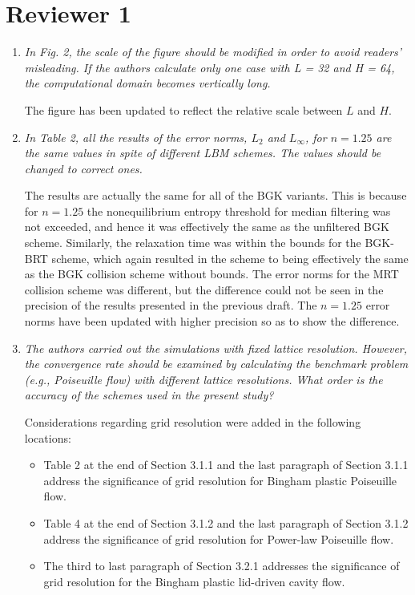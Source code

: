 \documentclass{article}
\begin{document}
	\section{Reviewer 1}
	\begin{enumerate}
		\item \emph{In Fig. 2, the scale of the figure should be modified in order to avoid readers’ misleading. If the authors calculate only one case with L = 32 and H = 64, the computational domain becomes vertically long.}
		
		The figure has been updated to reflect the relative scale between $L$ and $H$.
		
		\item \emph{In Table 2, all the results of the error norms, $L_{2}$ and $L_{\infty}$, for $n = 1.25$ are the same values in spite of different LBM schemes. The values should be changed to correct ones.}
		
		The results are actually the same for all of the BGK variants.
		This is because for $n = 1.25$ the nonequilibrium entropy threshold for median filtering was not exceeded, and hence it was effectively the same as the unfiltered BGK scheme.
		Similarly, the relaxation time was within the bounds for the BGK-BRT scheme, which again resulted in the scheme to being effectively the same as the BGK collision scheme without bounds.
		The error norms for the MRT collision scheme was different, but the difference could not be seen in the precision of the results presented in the previous draft.
		The $n = 1.25$ error norms have been updated with higher precision so as to show the difference.
		
		\item \emph{The authors carried out the simulations with fixed lattice resolution. However, the convergence rate should be examined by calculating the benchmark problem (e.g., Poiseuille flow) with different lattice resolutions. 
		What order is the accuracy of the schemes used in the present study?}
	
		Considerations regarding grid resolution were added in the following locations:
		\begin{itemize}
			\item Table 2 at the end of Section 3.1.1 and the last paragraph of Section 3.1.1 address the significance of grid resolution for Bingham plastic Poiseuille flow.
			\item Table 4 at the end of Section 3.1.2 and the last paragraph of Section 3.1.2 address the significance of grid resolution for Power-law Poiseuille flow. 
			\item The third to last paragraph of Section 3.2.1 addresses the significance of grid resolution for the Bingham plastic lid-driven cavity flow.
		\end{itemize}
	\end{enumerate}
\end{document}
